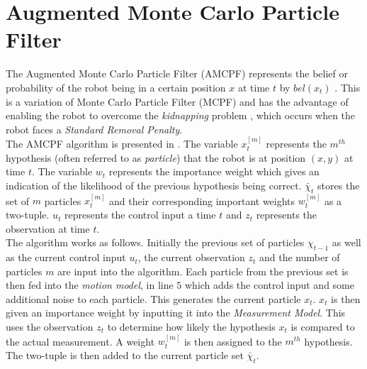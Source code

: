\section{Augmented Monte Carlo Particle Filter}
\label{sec:amcpf}
The Augmented Monte Carlo Particle Filter (AMCPF) represents the belief or probability of the robot being in a certain position $x$ at time $t$ by $bel(x_t)$ \citep{Thrun2002}. This is a variation of Monte Carlo Particle Filter (MCPF) \citep{Thrun2002} and has the advantage of enabling the robot to overcome the \textit{kidnapping} problem \citep{Thrun2002}, which occurs when the robot faces a \textit{Standard Removal Penalty}. \\

The AMCPF algorithm is presented in  \citep{Thrun2002}. The variable $x_t^{[m]}$ represents the $m^{th}$ hypothesis (often referred to as \textit{particle}) that the robot is at position $(x,y)$ at time $t$. The variable $w_t$ represents the importance weight which gives an indication of the likelihood of the previous hypothesis being correct. $\bar{\chi}_t$ stores the set of $m$ particles $x_t^{[m]}$ and their corresponding important weights $w_t^{[m]}$ as a two-tuple. $u_t$ represents the control input a time $t$ and $z_t$ represents the observation at time $t$. \\

The algorithm works as follows. Initially the previous set of particles $\chi_{t-1}$ as well as the current control input $u_t$, the current observation $z_t$ and the number of particles $m$ are input into the algorithm. Each particle from the previous set is then fed into the \textit{motion model}, in line $5$ which adds the control input and some additional noise to each particle. This generates the current particle $x_t$. $x_t$ is then given an importance weight by inputting it into the \textit{Measurement Model}. This uses the observation $z_t$ to determine how likely the hypothesis $x_t$ is compared to the actual measurement. A weight $w_t^{[m]}$ is then assigned to the $m^{th}$ hypothesis. The two-tuple is then added to the current particle set $\bar{\chi}_t$.\\

